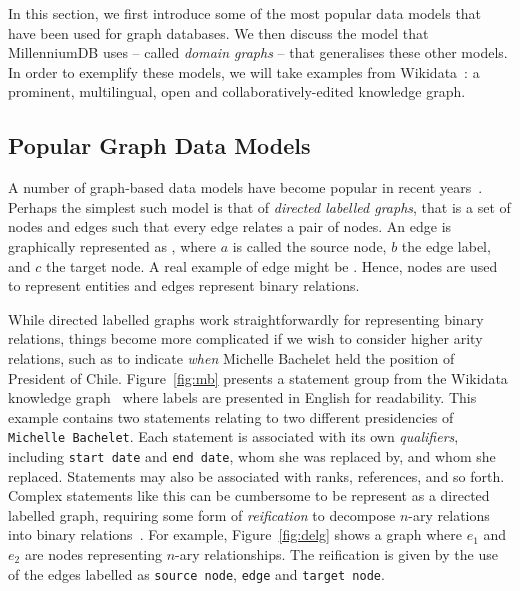 
In this section, we first introduce some of the most popular data models that have been used for graph databases. We then discuss the model that MillenniumDB uses -- called \textit{domain graphs} -- that generalises these other models. In order to exemplify these models, we will take examples from Wikidata~\cite{VrandecicK14}: a prominent, multilingual, open and collaboratively-edited knowledge graph.

\subsection{Popular Graph Data Models}

A number of graph-based data models have become popular in recent years~\cite{AnglesABHRV17}. Perhaps the simplest such model is that of \textit{directed labelled graphs}, that is a set of nodes and edges such that every edge relates a pair of nodes. An edge is graphically represented as , where $a$ is called the source node, $b$ the edge label, and $c$ the target node. A real example of edge might be . Hence, nodes are used to represent entities and edges represent binary relations.  

While directed labelled graphs work straightforwardly for representing binary relations, things become more complicated if we wish to consider higher arity relations, such as to indicate \textit{when} Michelle Bachelet held the position of President of Chile. Figure~\ref{fig:mb} presents a statement group from the Wikidata knowledge graph~\cite{VrandecicK14} where labels are presented in English for readability. This example contains two statements relating to two different presidencies of \texttt{Michelle Bachelet}. Each statement is associated with its own \textit{qualifiers}, including \texttt{start date} and \texttt{end date}, whom she was replaced by, and whom she replaced. Statements may also be associated with ranks, references, and so forth. Complex statements like this can be cumbersome to be represent as a directed labelled graph, requiring some form of \textit{reification} to decompose $n$-ary relations into binary relations~\cite{HernandezHK15}. For example, Figure~\ref{fig:delg} shows a graph where $e_1$ and $e_2$ are nodes representing $n$-ary relationships. The reification is given by the use of the edges labelled as \texttt{source node}, \texttt{edge} and \texttt{target node}. 

